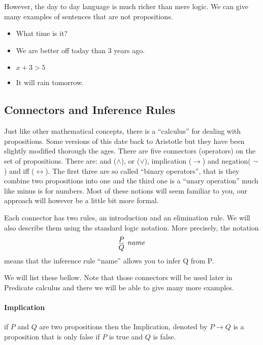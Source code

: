 However, the day to day language is much richer than mere logic. We can give  many examples of sentences that are not propositions. 

\begin{itemize}

\item What time is it?
\item  We are better off today than 3 years ago.
\item $x+3>5$
\item It will rain tomorrow.

\end{itemize}

  \subsection{Connectors and Inference Rules}
Just like other mathematical concepts, there is a ``calculus'' for dealing with  propositions. Some versions of this date back to Aristotle but they have been slightly modified thorough the ages. There are five connectors (operators) on the set of propositions. There are: and ($\land$), or ($\lor$),  implication ($\rightarrow$) and negation( $\neg$) and iff ($\leftrightarrow$). The first three are so called ``binary operators'', that is they combine two propositions into one and the third one is a ``unary operation''  much like minus is for numbers. Most of these notions will seem familiar to you, our approach will however be a little bit more formal. 

Each connector has two rules, an introduction and an elimination rule. We will also describe them using the standard logic notation. More precisely, the notation
$$\infer[name]{Q}{P}$$
means that the inference rule ``name'' allows you to infer Q from P.

 
 

 We will list these bellow. Note that those connectors will be used later in Predicate calculus and there we will be able to give many more examples.
\paragraph{\bf Implication}
if $P$ and $Q$ are two propositions then the Implication, denoted by $P\rightarrow Q$ is a proposition that is only false if  $P$ is true and $Q$ is false. 

